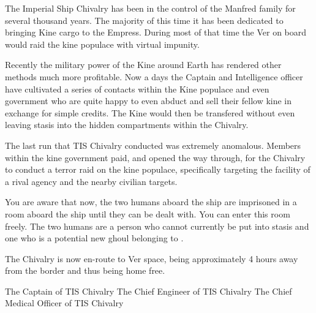 \documentclass[blue]{guildcamp4}
\begin{document}
\name{\bChivalry{}}

The Imperial Ship Chivalry has been in the control of the Manfred family for several thousand years. The majority of this time it has been dedicated to bringing Kine cargo to the Empress. During most of that time the Ver on board would raid the kine populace with virtual impunity.

Recently the military power of the Kine around Earth has rendered other methods much more profitable. Now a days the Captain and Intelligence officer have cultivated a series of contacts within the Kine populace and even government who are quite happy to even abduct and sell their fellow kine in exchange for simple credits. The Kine would then be transfered without even leaving stasis into the hidden compartments within the Chivalry. 

The last run that TIS Chivalry conducted was extremely anomalous. Members within the kine government paid, and opened the way through, for the Chivalry to conduct a terror raid on the kine populace, specifically targeting the facility of a rival agency and the nearby civilian targets. 

You are aware that now, the two humans aboard the ship are imprisoned in a room aboard the ship until they can be dealt with. You can enter this room freely. The two humans are a person who cannot currently be put into stasis and one who is a potential new ghoul belonging to \cVone{}.

The Chivalry is now en-route to Ver space, being approximately 4 hours away from the border and thus being home free.


\begin{members}
	\member{\cVone{}} The Captain of TIS Chivalry
	\member{\cVtwo{}} The Chief Engineer of TIS Chivalry
	\member{\cVthree{}} The Chief Medical Officer of TIS Chivalry
	
\end{members}
\end{document}
